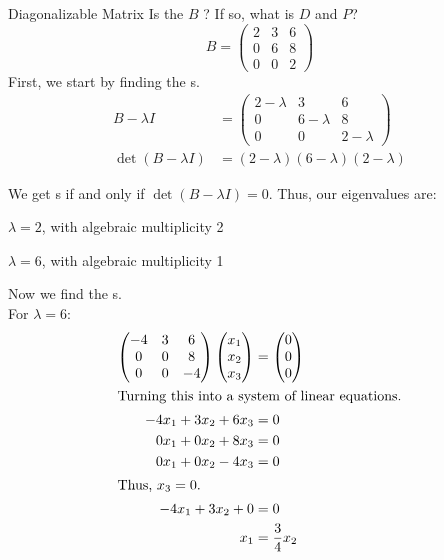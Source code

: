 \begin{example}{Diagonalizable Matrix}
  Is the  $B$ ?
  If so, what is $D$ and $P$?
  \begin{equation*}
    B = \begin{pmatrix}
      2 & 3 & 6 \\
      0 & 6 & 8 \\
      0 & 0 & 2
    \end{pmatrix}
  \end{equation*}
  \tcblower{}
  First, we start by finding the s.
  \begin{align*}
    B - \lambda I &=
                    \begin{pmatrix}
                      2-\lambda & 3 & 6 \\
                      0 & 6-\lambda & 8 \\
                      0 & 0 & 2-\lambda
                    \end{pmatrix} \\
    \det(B - \lambda I) &= (2-\lambda) (6-\lambda) (2-\lambda)
  \end{align*}

  We get s if and only if $\det(B-\lambda I) = 0$.
  Thus, our eigenvalues are:
  \begin{description}[noitemsep]
  \item $\lambda = 2$, with algebraic multiplicity 2
  \item $\lambda = 6$, with algebraic multiplicity 1
  \end{description}

  Now we find the s. \\
  For $\lambda = 6$:
  \begin{align*}
    \begin{pmatrix}
      -4 & 3 & 6 \\
      0 & 0 & 8 \\
      0 & 0 & -4
    \end{pmatrix}
              \begin{pmatrix}
                x_{1} \\ x_{2} \\ x_{3}
              \end{pmatrix} &=
                              \begin{pmatrix}
                                0 \\ 0 \\ 0
                              \end{pmatrix} \\
    \intertext{Turning this into a system of linear equations.}
    -4x_{1} + 3x_{2} + 6x_{3} &= 0 \\
    0x_{1} + 0x_{2} + 8x_{3} &= 0 \\
    0x_{1} + 0x_{2} - 4x_{3} &= 0 \\
    \intertext{Thus, $x_{3} = 0$.}
    -4x_{1} + 3x_{2} + 0 &= 0 \\
    x_{1} &= \frac{3}{4} x_{2}
  \end{align*}


\end{example}
